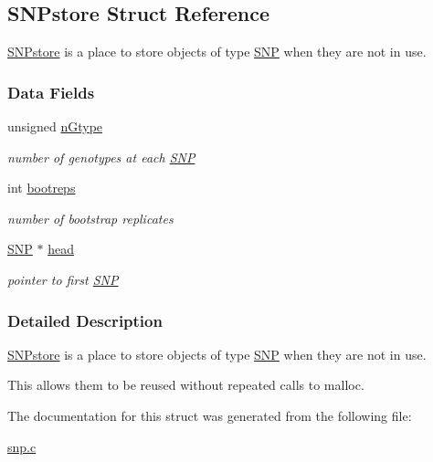 \hypertarget{struct_s_n_pstore}{\subsection{\-S\-N\-Pstore \-Struct \-Reference}
\label{struct_s_n_pstore}
}


\hyperlink{struct_s_n_pstore}{\-S\-N\-Pstore} is a place to store objects of type \hyperlink{struct_s_n_p}{\-S\-N\-P} when they are not in use.  


\subsubsection*{\-Data \-Fields}
\begin{DoxyCompactItemize}
\item 
\hypertarget{struct_s_n_pstore_ad3b9b0d83c42f772cb02f1f6828e6e06}{unsigned \hyperlink{struct_s_n_pstore_ad3b9b0d83c42f772cb02f1f6828e6e06}{n\-Gtype}}\label{struct_s_n_pstore_ad3b9b0d83c42f772cb02f1f6828e6e06}

\begin{DoxyCompactList}\small\item\em number of genotypes at each \hyperlink{struct_s_n_p}{\-S\-N\-P} \end{DoxyCompactList}\item 
\hypertarget{struct_s_n_pstore_ae81739ef2159f586c1766965f507dc6f}{int \hyperlink{struct_s_n_pstore_ae81739ef2159f586c1766965f507dc6f}{bootreps}}\label{struct_s_n_pstore_ae81739ef2159f586c1766965f507dc6f}

\begin{DoxyCompactList}\small\item\em number of bootstrap replicates \end{DoxyCompactList}\item 
\hypertarget{struct_s_n_pstore_ad4111e057cc8e274db0346d0f1ddd4fd}{\hyperlink{struct_s_n_p}{\-S\-N\-P} $\ast$ \hyperlink{struct_s_n_pstore_ad4111e057cc8e274db0346d0f1ddd4fd}{head}}\label{struct_s_n_pstore_ad4111e057cc8e274db0346d0f1ddd4fd}

\begin{DoxyCompactList}\small\item\em pointer to first \hyperlink{struct_s_n_p}{\-S\-N\-P} \end{DoxyCompactList}\end{DoxyCompactItemize}


\subsubsection{\-Detailed \-Description}
\hyperlink{struct_s_n_pstore}{\-S\-N\-Pstore} is a place to store objects of type \hyperlink{struct_s_n_p}{\-S\-N\-P} when they are not in use. 

\-This allows them to be reused without repeated calls to malloc. 

\-The documentation for this struct was generated from the following file\-:\begin{DoxyCompactItemize}
\item 
\hyperlink{snp_8c}{snp.\-c}\end{DoxyCompactItemize}
